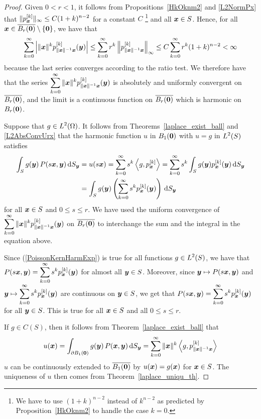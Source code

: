 \begin{proof}
Given $0 < r < 1$, it follows from Propositions~\ref{HkOknm2} and
\ref{L2NormPx} that
$\displaystyle \|p_{{\bm{x}}}^{[k]}\|_\infty \leq C (1+k)^{n-2}$
for a constant $C$ \footnote{We have to use $(1+k)^{n-2}$ instead of
$k^{n-2}$ as predicted by Proposition~\ref{HkOknm2} to handle the case $k=0$.}
and all ${\bm{x}} \in S$.  Hence, for all
${\bm{x}} \in \overline{B_r({\bm{0}})} \setminus\{{\bm{0}}\}$,
we have that
\begin{align*}
\sum_{k=0}^\infty \left| \|{\bm{x}}\|^k
p_{\|{\bm{x}}\|^{-1}{\bm{x}}}^{[k]}({\bm{y}}) \right|
\leq \sum_{k=0}^\infty r^k \left\|p_{\|{\bm{x}}\|^{-1}{\bm{x}}}^{[k]}\right\|_\infty
\leq C \sum_{k=0}^\infty  r^k (1+k)^{n-2}  < \infty
\end{align*}
because the last series converges according to the ratio test.
We therefore have that the series 
$\displaystyle \sum_{k=0}^\infty \|{\bm{x}}\|^k
p_{\|{\bm{x}}\|^{-1}{\bm{x}}}^{[k]}({\bm{y}})$
is absolutely and uniformly
convergent on $\overline{B_r({\bm{0}})}$, and the limit is a continuous
function on $\overline{B_r({\bm{0}})}$ which is harmonic on $B_r({\bm{0}})$.

Suppose that $\displaystyle g \in L^2(\Omega)$.
It follows from Theorems~\ref{laplace_exist_ball} and
\ref{L2AbsConvUrx} that the harmonic function $u$ in
$B_1({\bm{0}})$ with $u=g$ in $\displaystyle L^2(S)$ satisfies
\begin{equation} \label{PoissonKernHarmExp}
\begin{split}
\int_S g({\bm{y}}) \, P(s{\bm{x}},{\bm{y}}) \,\mathrm{d}{S}_{{\bm{y}}}
&= u(s{\bm{x}}) = \sum_{k=0}^\infty s^k \left\langle{g} , {p_{{\bm{x}}}^{[k]}}\right\rangle
= \sum_{k=0}^\infty s^k \int_S g({\bm{y}}) p_{{\bm{x}}}^{[k]}({\bm{y}}) \,\mathrm{d}{S}_{{\bm{y}}} \\
&= \int_S g({\bm{y}}) \left(\sum_{k=0}^\infty s^k
p_{{\bm{x}}}^{[k]}({\bm{y}})\right) \,\mathrm{d}{S}_{{\bm{y}}}
\end{split}
\end{equation}
for all ${\bm{x}} \in S$ and $0 \leq s \leq r$.
We have used the uniform convergence of
$\displaystyle \sum_{k=0}^\infty \|{\bm{x}}\|^k
p_{\|{\bm{x}}\|^{-1}{\bm{x}}}^{[k]}({\bm{y}})$ on
$\displaystyle \overline{B_r({\bm{0}})}$ to interchange the sum
and the integral in the equation above.  

Since (\ref{PoissonKernHarmExp}) is true for all functions
$\displaystyle g\in L^2(S)$,
we have that
$\displaystyle P(s{\bm{x}},{\bm{y}})
= \sum_{k=0}^\infty s^k p_{{\bm{x}}}^{[k]}({\bm{y}})$ for almost all
${\bm{y}} \in S$.  Moreover, since
$\displaystyle {\bm{y}} \mapsto P(s{\bm{x}},{\bm{y}})$ and
$\displaystyle {\bm{y}} \mapsto
\sum_{k=0}^\infty s^k p_{{\bm{x}}}^{[k]}({\bm{y}})$ are
continuous on ${\bm{y}} \in S$, we get that
$\displaystyle P(s{\bm{x}},{\bm{y}})
= \sum_{k=0}^\infty s^k p_{{\bm{x}}}^{[k]}({\bm{y}})$ for all
${\bm{y}} \in S$.  This is true for all ${\bm{x}} \in S$ and all
$0 \leq s \leq r$.

If $g \in C(S)$, then it follows from Theorem~\ref{laplace_exist_ball} that
\[
u({\bm{x}}) = \int_{\partial B_1({\bm{0}})} g({\bm{y}}) \,
P({\bm{x}},{\bm{y}}) \,\mathrm{d}{S}_{{\bm{y}}}
= \sum_{k=0}^\infty \|{\bm{x}}\|^k \left\langle{g} , {p_{\|{\bm{x}}\|^{-1} {\bm{x}}}^{[k]}}\right\rangle
\]
$u$ can be continuously extended to $\overline{B_1({\bm{0}})}$ by
$u({\bm{x}}) = g({\bm{x}})$ for ${\bm{x}} \in S$.
The uniqueness of $u$ then comes from Theorem~\ref{laplace_uniqu_th}.
\end{proof}

